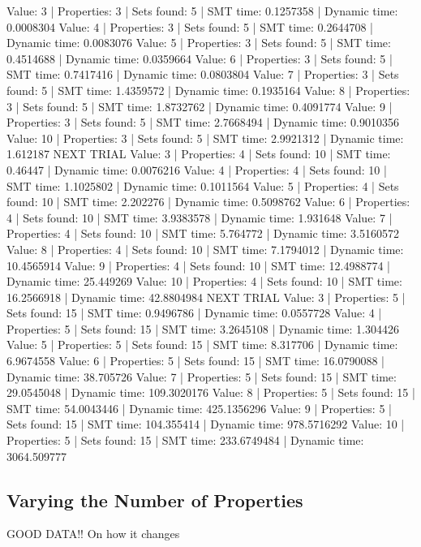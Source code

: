 \documentclass[pageno]{jpaper}
\begin{document}
Value: 3 | Properties: 3 | Sets found: 5 | SMT time: 0.1257358 | Dynamic time: 0.0008304
Value: 4 | Properties: 3 | Sets found: 5 | SMT time: 0.2644708 | Dynamic time: 0.0083076
Value: 5 | Properties: 3 | Sets found: 5 | SMT time: 0.4514688 | Dynamic time: 0.0359664
Value: 6 | Properties: 3 | Sets found: 5 | SMT time: 0.7417416 | Dynamic time: 0.0803804
Value: 7 | Properties: 3 | Sets found: 5 | SMT time: 1.4359572 | Dynamic time: 0.1935164
Value: 8 | Properties: 3 | Sets found: 5 | SMT time: 1.8732762 | Dynamic time: 0.4091774
Value: 9 | Properties: 3 | Sets found: 5 | SMT time: 2.7668494 | Dynamic time: 0.9010356
Value: 10 | Properties: 3 | Sets found: 5 | SMT time: 2.9921312 | Dynamic time: 1.612187
NEXT TRIAL
Value: 3 | Properties: 4 | Sets found: 10 | SMT time: 0.46447 | Dynamic time: 0.0076216
Value: 4 | Properties: 4 | Sets found: 10 | SMT time: 1.1025802 | Dynamic time: 0.1011564
Value: 5 | Properties: 4 | Sets found: 10 | SMT time: 2.202276 | Dynamic time: 0.5098762
Value: 6 | Properties: 4 | Sets found: 10 | SMT time: 3.9383578 | Dynamic time: 1.931648
Value: 7 | Properties: 4 | Sets found: 10 | SMT time: 5.764772 | Dynamic time: 3.5160572
Value: 8 | Properties: 4 | Sets found: 10 | SMT time: 7.1794012 | Dynamic time: 10.4565914
Value: 9 | Properties: 4 | Sets found: 10 | SMT time: 12.4988774 | Dynamic time: 25.449269
Value: 10 | Properties: 4 | Sets found: 10 | SMT time: 16.2566918 | Dynamic time: 42.8804984
NEXT TRIAL
Value: 3 | Properties: 5 | Sets found: 15 | SMT time: 0.9496786 | Dynamic time: 0.0557728
Value: 4 | Properties: 5 | Sets found: 15 | SMT time: 3.2645108 | Dynamic time: 1.304426
Value: 5 | Properties: 5 | Sets found: 15 | SMT time: 8.317706 | Dynamic time: 6.9674558
Value: 6 | Properties: 5 | Sets found: 15 | SMT time: 16.0790088 | Dynamic time: 38.705726
Value: 7 | Properties: 5 | Sets found: 15 | SMT time: 29.0545048 | Dynamic time: 109.3020176
Value: 8 | Properties: 5 | Sets found: 15 | SMT time: 54.0043446 | Dynamic time: 425.1356296
Value: 9 | Properties: 5 | Sets found: 15 | SMT time: 104.355414 | Dynamic time: 978.5716292
Value: 10 | Properties: 5 | Sets found: 15 | SMT time: 233.6749484 | Dynamic time: 3064.509777



\subsection{Varying the Number of Properties}

GOOD DATA!! On how it changes
\end{document}
